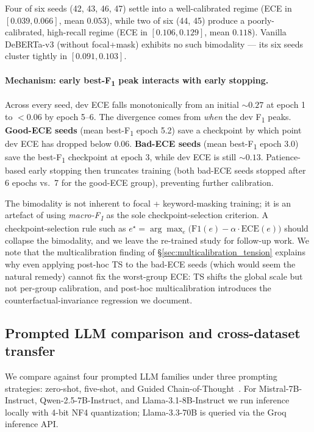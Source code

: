 Four of six seeds (42, 43, 46, 47) settle into a well-calibrated regime (ECE in $[0.039, 0.066]$, mean $0.053$), while two of six (44, 45) produce a poorly-calibrated, high-recall regime (ECE in $[0.106, 0.129]$, mean $0.118$). Vanilla DeBERTa-v3 (without focal+mask) exhibits no such bimodality --- its six seeds cluster tightly in $[0.091, 0.103]$.

\paragraph{Mechanism: early best-F\textsubscript{1} peak interacts with early stopping.}
Across every seed, dev ECE falls monotonically from an initial $\sim 0.27$ at epoch 1 to $< 0.06$ by epoch 5--6. The divergence comes from \emph{when} the dev F\textsubscript{1} peaks. \textbf{Good-ECE seeds} (mean best-F\textsubscript{1} epoch 5.2) save a checkpoint by which point dev ECE has dropped below $0.06$. \textbf{Bad-ECE seeds} (mean best-F\textsubscript{1} epoch 3.0) save the best-F\textsubscript{1} checkpoint at epoch 3, while dev ECE is still $\sim 0.13$. Patience-based early stopping then truncates training (both bad-ECE seeds stopped after 6 epochs vs.\ 7 for the good-ECE group), preventing further calibration.

The bimodality is not inherent to focal + keyword-masking training; it is an artefact of using \emph{macro-F\textsubscript{1}} as the sole checkpoint-selection criterion. A checkpoint-selection rule such as $e^\star = \arg\max_e \big( \mathrm{F1}(e) - \alpha \cdot \mathrm{ECE}(e) \big)$ should collapse the bimodality, and we leave the re-trained study for follow-up work. We note that the multicalibration finding of \S\ref{sec:multicalibration_tension} explains why even applying post-hoc TS to the bad-ECE seeds (which would seem the natural remedy) cannot fix the worst-group ECE: TS shifts the global scale but not per-group calibration, and post-hoc multicalibration introduces the counterfactual-invariance regression we document.

\subsection{Prompted LLM comparison and cross-dataset transfer}
\label{sec:llm_and_transfer}

We compare against four prompted LLM families under three prompting strategies: zero-shot, five-shot, and Guided Chain-of-Thought~\citep{patel2025evaluating}. For Mistral-7B-Instruct, Qwen-2.5-7B-Instruct, and Llama-3.1-8B-Instruct we run inference locally with 4-bit NF4 quantization; Llama-3.3-70B is queried via the Groq inference API.

